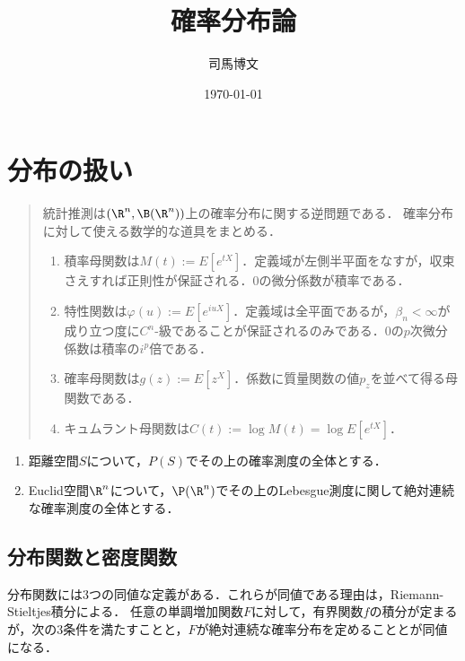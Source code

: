 \documentclass[uplatex,dvipdfmx]{jsreport}
\title{確率分布論}
\author{司馬博文}
\date{\today}
\begin{document}
\tableofcontents

\chapter{分布の扱い}

\begin{quotation}
    統計推測は$(\R^n,\B(\R^n))$上の確率分布に関する逆問題である．
    確率分布に対して使える数学的な道具をまとめる．
    \begin{enumerate}
        \item 積率母関数は$M(t):=E[e^{tX}]$．定義域が左側半平面をなすが，収束さえすれば正則性が保証される．$0$の微分係数が積率である．
        \item 特性関数は$\varphi(u):=E[e^{iuX}]$．定義域は全平面であるが，$\beta_n<\infty$が成り立つ度に$C^n$-級であることが保証されるのみである．$0$の$p$次微分係数は積率の$i^p$倍である．
        \item 確率母関数は$g(z):=E[z^X]$．係数に質量関数の値$p_z$を並べて得る母関数である．
        \item キュムラント母関数は$C(t):=\log M(t)=\log E[e^{tX}]$．
    \end{enumerate}
\end{quotation}

\begin{notation}\mbox{}
    \begin{enumerate}
        \item 距離空間$S$について，$P(S)$でその上の確率測度の全体とする．
        \item Euclid空間$\R^n$について，$\P(\R^n)$でその上のLebesgue測度に関して絶対連続な確率測度の全体とする．
    \end{enumerate}
\end{notation}

\section{分布関数と密度関数}

\begin{tcolorbox}[colframe=ForestGreen, colback=ForestGreen!10!white,breakable,colbacktitle=ForestGreen!40!white,coltitle=black,fonttitle=\bfseries\sffamily,
title=]
    分布関数には3つの同値な定義がある．これらが同値である理由は，Riemann-Stieltjes積分による．
    任意の単調増加関数$F$に対して，有界関数$f$の積分が定まるが，次の3条件を満たすことと，$F$が絶対連続な確率分布を定めることとが同値になる．
\end{tcolorbox}
\end{document}
